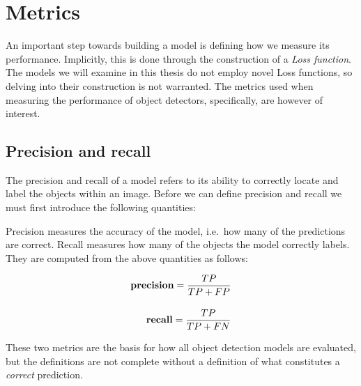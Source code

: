 \section{Metrics}

An important step towards building a model is defining how we measure its performance.
Implicitly, this is done through the construction of a \textit{Loss function}.
The models we will examine in this thesis do not employ novel Loss functions, so delving into their construction is not warranted.
The metrics used when measuring the performance of object detectors, specifically, are however of interest.

\subsection{Precision and recall}
The precision and recall of a model refers to its ability to correctly locate and label the objects within an image.
Before we can define precision and recall we must first introduce the following quantities:

\begin{center}
  {\setlength{\fboxsep}{1em}
  }
\end{center}

Precision measures the accuracy of the model, i.e.~how many of the predictions are correct.
Recall measures how many of the objects the model correctly labels.
They are computed from the above quantities as follows:

\begin{align*}
  \text{\bf precision}=\frac{TP}{TP+FP}\\[1em]
  \text{\bf recall}=\frac{TP}{TP+FN}
\end{align*}

These two metrics are the basis for how all object detection models are evaluated, but the definitions are not complete without a definition of what constitutes a \textit{correct} prediction.

